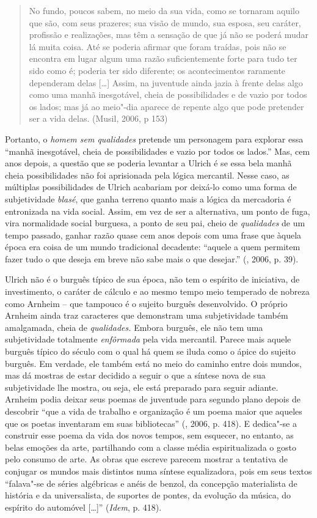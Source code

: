 \begin{quote}
No fundo, poucos sabem, no meio da sua vida, como se tornaram aquilo que
são, com seus prazeres; sua visão de mundo, sua esposa, seu caráter,
profissão e realizações, mas têm a sensação de que já não se poderá
mudar lá muita coisa. Até se poderia afirmar que foram traídas, pois não
se encontra em lugar algum uma razão suficientemente forte para tudo ter
sido como é; poderia ter sido diferente; os acontecimentos raramente
dependeram delas [\ldots{}] Assim, na juventude ainda jazia à frente
delas algo como uma manhã inesgotável, cheia de possibilidades e de
vazio por todos os lados; mas já ao meio"-dia aparece de repente algo que
pode pretender ser a vida delas. (Musil, 2006, p 153)
\end{quote}

Portanto, o \emph{homem sem qualidades} pretende um personagem para
explorar essa ``manhã inesgotável, cheia de possibilidades e vazio por
todos os lados.'' Mas, cem anos depois, a questão que se poderia
levantar a Ulrich é se essa bela manhã cheia possibilidades não foi
aprisionada pela lógica mercantil. Nesse caso, as múltiplas
possibilidades de Ulrich acabariam por deixá-lo como uma forma de
subjetividade \emph{blasé}, que ganha terreno quanto mais a lógica da
mercadoria é entronizada na vida social. Assim, em vez de ser a
alternativa, um ponto de fuga, vira normalidade social burguesa, a ponto
de seu pai, cheio de \emph{qualidades} de um tempo passado, ganhar razão
quase cem anos depois com uma frase que àquela época era coisa de um
mundo tradicional decadente: ``aquele a quem permitem fazer tudo o que
deseja em breve não sabe mais o que desejar.'' (, 2006, p. 39).

Ulrich não é o burguês típico de sua época, não tem o espírito de
iniciativa, de investimento, o caráter de cálculo e ao mesmo tempo meio
temperado de nobreza como Arnheim -- que tampouco é o sujeito burguês
desenvolvido. O próprio Arnheim ainda traz caracteres que demonstram uma
subjetividade também amalgamada, cheia de \emph{qualidades.} Embora
burguês, ele não tem uma subjetividade totalmente \emph{enfôrmada} pela
vida mercantil. Parece mais aquele burguês típico do século  com o
qual há quem se iluda como o ápice do sujeito burguês. Em verdade, ele
também está no meio do caminho entre dois mundos, mas dá mostras de
estar decidido a seguir o que a síntese nova de sua subjetividade lhe
mostra, ou seja, ele está preparado para seguir adiante. Arnheim podia
deixar seus poemas de juventude para segundo plano depois de descobrir
``que a vida de trabalho e organização é um poema maior que aqueles que
os poetas inventaram em suas bibliotecas'' (, 2006, p. 418). E
dedica"-se a construir esse poema da vida dos novos tempos, sem esquecer,
no entanto, as belas emoções da arte, partilhando com a classe média
espiritualizada o gosto pelo consumo de arte. As obras que escreve
parecem mostrar a tentativa de conjugar os mundos mais distintos numa
síntese equalizadora, pois em seus textos ``falava"-se de séries
algébricas e anéis de benzol, da concepção materialista de história e da
universalista, de suportes de pontes, da evolução da música, do espírito
do automóvel [\ldots{}]'' (\emph{Idem}, p. 418).

